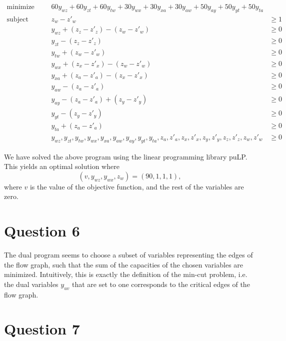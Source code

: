 \documentclass[a4paper, 10pt, oneside, article]{memoir}
\begin{document}
\begin{align*}
\text{minimize}   &&& 60y_{wz} + 60y_{zt} + 60y_{tw} + 30y_{wx} + 30y_{xa} + 30y_{aw} + 50y_{ay} + 50y_{yt} + 50y_{ta}  \\
\text{subject to} &&& z_{w}  -z'_{w} &\geq 1 \\
                  &&&y_{wz} + (z_{z}  -z'_{z})  - (z_{w} - z'_{w}) &\geq 0 \\
                  &&&y_{zt}  - (z_{z} - z'_{z}) &\geq 0 \\
                  &&&y_{tw} + (z_{w}  -z'_{w}) &\geq 0 \\
                  &&&y_{wx} + (z_{x}  -z'_{x})  -(z_{w} -  z'_{w}) &\geq 0 \\
                  &&&y_{xa} + (z_{a}  -z'_{a})  -(z_{x} - z'_{x}) &\geq 0 \\
                  &&&y_{aw}  -(z_{a} - z'_{a}) &\geq 0 \\
                  &&&y_{ay}  -(z_{a} - z'_{a}) + (z_{y}  -z'_{y}) &\geq 0 \\
                  &&&y_{yt}  -(z_{y} - z'_{y}) &\geq 0 \\
                  &&&y_{ta} + (z_{a}  -z'_{a}) &\geq 0 \\
                  &&& y_{wz}, y_{zt}, y_{tw}, y_{wx}, y_{xa}, y_{aw}, y_{ay}, y_{yt}, y_{ta}, z_{a}, z'_{a}, z_{x}, z'_{x}, z_{y}, z'_{y}, z_{z}, z'_{z}, z_{w}, z'_{w} &\geq 0
\end{align*}

We have solved the above program using the linear programming library
puLP. This yields an optimal solution where
\begin{equation*}
(v, y_{wz}, y_{wx}, z_{w}) =(90, 1, 1, 1),
\end{equation*}
where $v$ is the value of the objective function, and the rest of the
variables are zero.

\section*{Question 6}

The dual program seems to choose a subset of variables representing
the edges of the flow graph, such that the sum of the capacities of
the chosen variables are minimized. Intuitively, this is exactly the
definition of the min-cut problem, i.e. the dual variables $y_{uv}$
that are set to one corresponds to the critical edges of the flow
graph.

\section*{Question 7}
\end{document}
